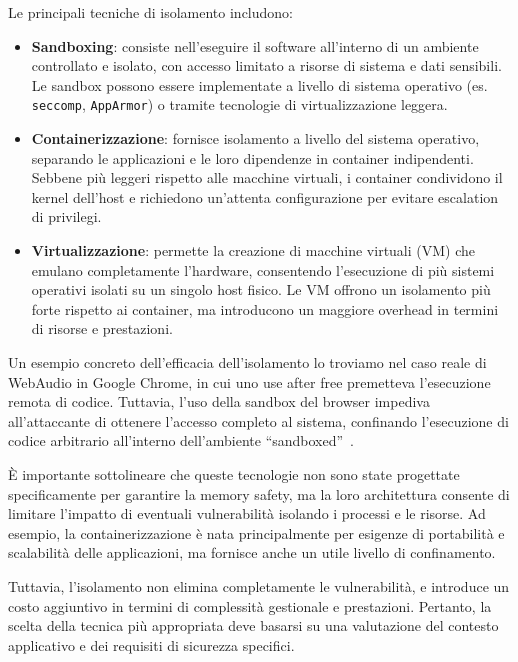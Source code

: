 Le principali tecniche di isolamento includono:
\begin{itemize}
  \item \textbf{Sandboxing}: consiste nell'eseguire il software all'interno di un
    ambiente controllato e isolato, con accesso limitato a risorse di sistema e
    dati sensibili. Le sandbox possono essere implementate a livello di sistema operativo
    (es. \texttt{seccomp}, \texttt{AppArmor}) o tramite tecnologie di virtualizzazione
    leggera.

  \item \textbf{Containerizzazione}: fornisce isolamento a livello del sistema operativo,
    separando le applicazioni e le loro dipendenze in container indipendenti. Sebbene
    più leggeri rispetto alle macchine virtuali, i container condividono il
    kernel dell'host e richiedono un'attenta configurazione per evitare
    escalation di privilegi.

  \item \textbf{Virtualizzazione}: permette la creazione di macchine virtuali (VM)
    che emulano completamente l'hardware, consentendo l'esecuzione di più
    sistemi operativi isolati su un singolo host fisico. Le VM offrono un isolamento
    più forte rispetto ai container, ma introducono un maggiore overhead in
    termini di risorse e prestazioni.
\end{itemize}

Un esempio concreto dell'efficacia dell'isolamento lo troviamo nel caso reale di
WebAudio in Google Chrome, in cui uno use after free premetteva l'esecuzione
remota di codice. Tuttavia, l'uso della sandbox del browser impediva all'attaccante
di ottenere l'accesso completo al sistema, confinando l'esecuzione di codice arbitrario
all'interno dell'ambiente ``sandboxed''~\cite{webaudio_uaf}.

È importante sottolineare che queste tecnologie non sono state progettate
specificamente per garantire la memory safety, ma la loro architettura consente di
limitare l'impatto di eventuali vulnerabilità isolando i processi e le risorse.
Ad esempio, la containerizzazione è nata principalmente per esigenze di portabilità
e scalabilità delle applicazioni, ma fornisce anche un utile livello di
confinamento.

Tuttavia, l'isolamento non elimina completamente le vulnerabilità, e introduce
un costo aggiuntivo in termini di complessità gestionale e prestazioni. Pertanto,
la scelta della tecnica più appropriata deve basarsi su una valutazione del
contesto applicativo e dei requisiti di sicurezza specifici.